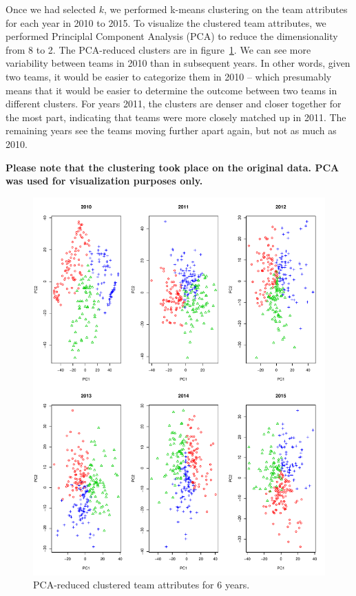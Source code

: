 \documentclass[11pt]{article}
\begin{document}
Once we had selected $k$, we performed k-means clustering on the team attributes for each year in 2010 to 2015.
To visualize the clustered team attributes, we performed Principlal Component Analysis (PCA) to reduce the dimensionality from 8 to 2.
The PCA-reduced clusters are in figure~\ref{fig:clusters}.
We can see more variability between teams in 2010 than in subsequent years.
In other words, given two teams, it would be easier to categorize them in 2010 -- which presumably means that it would be easier to determine the outcome between two teams in different clusters.
For years 2011, the clusters are denser and closer together for the most part, indicating that teams were more closely matched up in 2011.
The remaining years see the teams moving further apart again, but not as much as 2010.

\textbf{Please note that the clustering took place on the original data.
PCA was used for visualization purposes only.}

\begin{figure}[ht]
  \centering
  \includegraphics[scale=0.6]{clusters}
  \caption{PCA-reduced clustered team attributes for 6 years.}
  \label{fig:clusters}
\end{figure}
\end{document}
